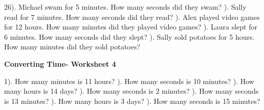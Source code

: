 \documentclass{article}%
\begin{document}
26). Michael swam for 5 minutes. How many seconds did they swam?%
\newline%
\newline%
). Sally read for 7 minutes. How many seconds did they read?%
\newline%
\newline%
). Alex played video games for 12 hours. How many minutes did they played video games?%
\newline%
\newline%
). Laura slept for 6 minutes. How many seconds did they slept?%
\newline%
\newline%
). Sally sold potatoes for 5 hours. How many minutes did they sold potatoes?%
\newline%
\newline%
\newline%
\pagebreak%
\large%
\begin{center}%
\textbf{Converting Time- Worksheet 4}%
\newline%
\newline%
\newline%
\end{center} \normalsize%
1). How many minutes is 11 hours?%
\newline%
\newline%
). How many seconds is 10 minutes?%
\newline%
\newline%
). How many hours is 14 days?%
\newline%
\newline%
). How many seconds is 2 minutes?%
\newline%
\newline%
). How many seconds is 13 minutes?%
\newline%
\newline%
). How many hours is 3 days?%
\newline%
\newline%
). How many seconds is 15 minutes?%
\newline%
\end{document}
